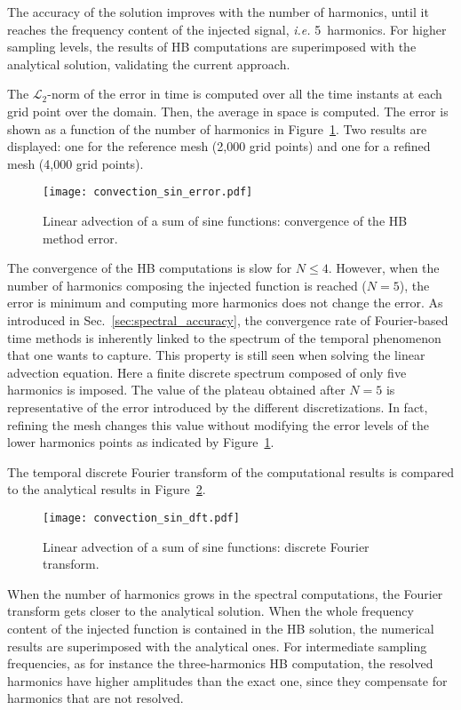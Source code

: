 The accuracy of the solution 
improves with the number of harmonics,
until it reaches the frequency content
of the injected signal, \emph{i.e.} 5~harmonics.
For higher sampling levels, the results of HB computations are
superimposed with the analytical solution, validating the current approach.

The $\mathcal{L}_2$-norm of the error 
in time is computed over all the time instants
at each grid point over the domain.
Then, the average in space is computed.
The error is shown as a function of the number of harmonics
in Figure~\ref{fig:conv_sum_sine}. Two results are displayed:
one for the reference mesh (2,000 grid points) and one for
a refined mesh (4,000 grid points).
\begin{figure}[htp]
  \centering
  \texttt{[image: convection\_sin\_error.pdf]}
  \caption{Linear advection of a sum of sine functions: convergence of the HB method error.}
  \label{fig:conv_sum_sine}
\end{figure}
The convergence of the HB computations is slow  for
$N \leq 4$. However, when the number of harmonics composing
the injected function is reached ($N=5$), the error is minimum and computing
more harmonics does not change the error. As introduced in 
Sec.~\ref{sec:spectral_accuracy},
the convergence rate 
of Fourier-based time methods is inherently linked to the spectrum of the
temporal phenomenon that one wants to capture. This property is still
seen when solving the linear advection equation.
Here a finite discrete spectrum composed of only five harmonics
is imposed.
The value of the plateau obtained 
after $N=5$ is representative of the error introduced by the different
discretizations. In fact, refining the mesh changes this value
without modifying the error levels of the lower harmonics points
as indicated by Figure~\ref{fig:conv_sum_sine}.

The temporal discrete Fourier transform
of the computational results is compared to the
analytical results in Figure~\ref{fig:dft_sin}.
\begin{figure}[htp]
  \centering
  \texttt{[image: convection\_sin\_dft.pdf]}
  \caption{Linear advection of a sum of sine functions: 
  discrete Fourier transform.}
  \label{fig:dft_sin}
\end{figure}
When the number of harmonics grows in the spectral computations,
the Fourier transform gets closer to the analytical solution.
When the whole frequency content of the injected 
function is contained in the HB solution, 
the numerical results are superimposed with the analytical ones.
For intermediate sampling frequencies, as for 
instance the three-harmonics HB computation, 
the resolved harmonics have higher amplitudes 
than the exact one, since they compensate for harmonics that are not resolved.

